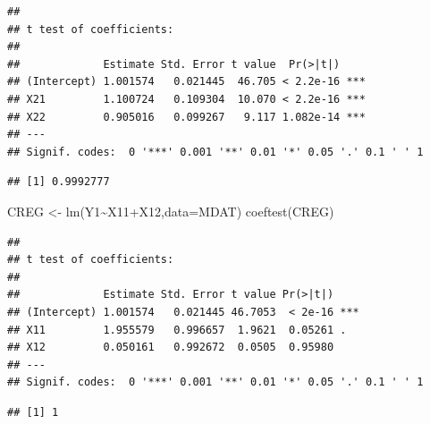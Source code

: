 \documentclass[
]{book}
\newenvironment{Shaded}{\begin{snugshade}}{\end{snugshade}}
\newcommand{\AttributeTok}[1]{\textcolor[rgb]{0.77,0.63,0.00}{#1}}
\newcommand{\CommentTok}[1]{\textcolor[rgb]{0.56,0.35,0.01}{\textit{#1}}}
\newcommand{\FunctionTok}[1]{\textcolor[rgb]{0.00,0.00,0.00}{#1}}
\newcommand{\NormalTok}[1]{#1}
\newcommand{\OtherTok}[1]{\textcolor[rgb]{0.56,0.35,0.01}{#1}}
\newcommand{\SpecialCharTok}[1]{\textcolor[rgb]{0.00,0.00,0.00}{#1}}
\begin{document}
\begin{verbatim}
## 
## t test of coefficients:
## 
##             Estimate Std. Error t value  Pr(>|t|)    
## (Intercept) 1.001574   0.021445  46.705 < 2.2e-16 ***
## X21         1.100724   0.109304  10.070 < 2.2e-16 ***
## X22         0.905016   0.099267   9.117 1.082e-14 ***
## ---
## Signif. codes:  0 '***' 0.001 '**' 0.01 '*' 0.05 '.' 0.1 ' ' 1
\end{verbatim}

\begin{Shaded}
\end{Shaded}

\begin{verbatim}
## [1] 0.9992777
\end{verbatim}

\begin{Shaded}
\begin{Highlighting}[]
\NormalTok{CREG }\OtherTok{\textless{}{-}} \FunctionTok{lm}\NormalTok{(Y1}\SpecialCharTok{\textasciitilde{}}\NormalTok{X11}\SpecialCharTok{+}\NormalTok{X12,}\AttributeTok{data=}\NormalTok{MDAT)}
\FunctionTok{coeftest}\NormalTok{(CREG)}
\end{Highlighting}
\end{Shaded}

\begin{verbatim}
## 
## t test of coefficients:
## 
##             Estimate Std. Error t value Pr(>|t|)    
## (Intercept) 1.001574   0.021445 46.7053  < 2e-16 ***
## X11         1.955579   0.996657  1.9621  0.05261 .  
## X12         0.050161   0.992672  0.0505  0.95980    
## ---
## Signif. codes:  0 '***' 0.001 '**' 0.01 '*' 0.05 '.' 0.1 ' ' 1
\end{verbatim}

\begin{Shaded}
\end{Shaded}

\begin{verbatim}
## [1] 1
\end{verbatim}
\end{document}
